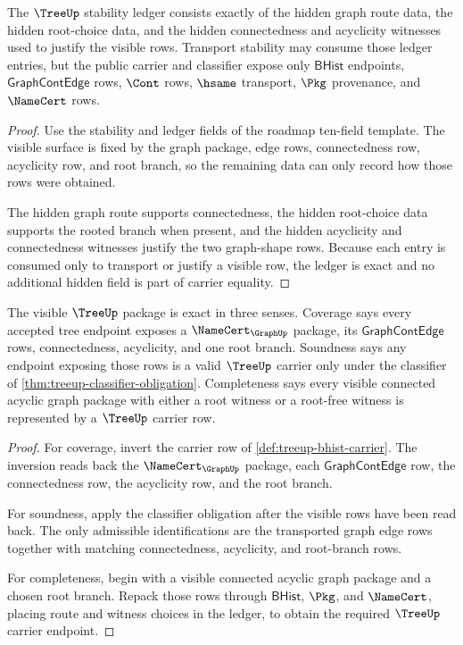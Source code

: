 \begin{theorem}\label{thm:treeup-stability-ledger-obligation}
The $\TreeUp$ stability ledger consists exactly of the hidden graph route data,
the hidden root-choice data, and the hidden connectedness and acyclicity
witnesses used to justify the visible rows. Transport stability may consume
those ledger entries, but the public carrier and classifier expose only
$\mathsf{BHist}$ endpoints, $\mathsf{GraphContEdge}$ rows, $\Cont$ rows,
$\hsame$ transport, $\Pkg$ provenance, and $\NameCert$ rows.
\end{theorem}
\begin{proof}
Use the stability and ledger fields of the roadmap ten-field template. The
visible surface is fixed by the graph package, edge rows, connectedness row,
acyclicity row, and root branch, so the remaining data can only record how
those rows were obtained.

The hidden graph route supports connectedness, the hidden root-choice data
supports the rooted branch when present, and the hidden acyclicity and
connectedness witnesses justify the two graph-shape rows. Because each entry
is consumed only to transport or justify a visible row, the ledger is exact
and no additional hidden field is part of carrier equality.
\end{proof}

\begin{theorem}\label{thm:treeup-exactness-obligation}
The visible $\TreeUp$ package is exact in three senses. Coverage says every
accepted tree endpoint exposes a $\NameCert_{\GraphUp}$ package, its
$\mathsf{GraphContEdge}$ rows, connectedness, acyclicity, and one root branch.
Soundness says any endpoint exposing those rows is a valid $\TreeUp$ carrier
only under the classifier of \autoref{thm:treeup-classifier-obligation}.
Completeness says every visible connected acyclic graph package with either a
root witness or a root-free witness is represented by a $\TreeUp$ carrier row.
\end{theorem}
\begin{proof}
For coverage, invert the carrier row of
\autoref{def:treeup-bhist-carrier}. The inversion reads back the
$\NameCert_{\GraphUp}$ package, each $\mathsf{GraphContEdge}$ row, the
connectedness row, the acyclicity row, and the root branch.

For soundness, apply the classifier obligation after the visible rows have
been read back. The only admissible identifications are the transported graph
edge rows together with matching connectedness, acyclicity, and root-branch
rows.

For completeness, begin with a visible connected acyclic graph package and a
chosen root branch. Repack those rows through $\mathsf{BHist}$, $\Pkg$, and
$\NameCert$, placing route and witness choices in the ledger, to obtain the
required $\TreeUp$ carrier endpoint.
\end{proof}

